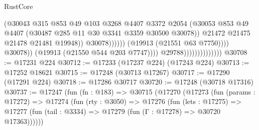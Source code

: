 \begin{lexlean}{RustCore}
\begin{coremodule}
                                                          (@30043
                                                            @315
                                                            @853
                                                            @49
                                                            @103
                                                            @3268
                                                            @4407
                                                            @3372
                                                            @2054
                                                            (@30053
                                                              @853
                                                              @49
                                                              @4407
                                                              (@30487
                                                                @285
                                                                @11
                                                                @30
                                                                @3341
                                                                @3359
                                                                @30500
                                                                @30078))
                                                            @21472
                                                            @21475
                                                            @21478
                                                            @21481
                                                            @19948))
                                                        @30078))))))
                                            (@19913 (@21551 @63 @7750))))
                                        @30078))
                                    (@19913 (@21550 @544 @203 @7747))))
                                @29788))))))))))))))
@30708 := @17231 @224
@30712 := @17233 (@17237 @224) (@17243 @224)
@30713 := @17252 @18621
@30715 := @17248 (@30713 @17267)
@30717 := @17290 (@17291 @224)
@30718 := @17286 @30717
@30720 := @17248 (@30718 @17316)
@30737 := @17247
    (fun (fn : @183) =>
    @30715
      (@17270
        (@17273
          (fun (params : @17272) =>
          @17274
            (fun (rty : @3050) =>
            @17276
              (fun (lets : @17275) =>
              @17277 (fun (tail : @3334) => @17279 (fun (Γ : @17278) => @30720 @17363))))))

\end{coremodule}
\end{lexlean}
